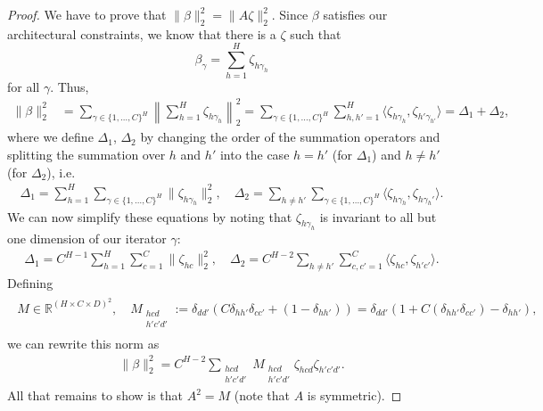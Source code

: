 \documentclass{article}
\theoremstyle{plain}
\theoremstyle{definition}
\theoremstyle{remark}
\begin{document}
\begin{proof}
We have to prove that $\|\beta\|_2^2=\|A\zeta\|_2^2$.
Since $\beta$ satisfies our architectural constraints, we know that there is a $\zeta$ such that
$$
\beta_{\gamma}=\sum_{h=1}^H\zeta_{h\gamma_h}
$$
for all $\gamma$.
Thus,
\begin{align*}
    \|\beta\|_2^2&=\sum_{\gamma\in\{1,\dotsc,C\}^H}\left\|\sum_{h=1}^H\zeta_{h\gamma_h}\right\|_2^2=\sum_{\gamma\in\{1,\dotsc,C\}^H}\sum_{h,h'=1}^H\langle\zeta_{h\gamma_h},\zeta_{h'\gamma_{h'}}\rangle=\Delta_1+\Delta_2,
\end{align*}
where we define $\Delta_1$, $\Delta_2$ by changing the order of the summation operators and splitting the summation over $h$ and $h'$ into the case $h=h'$ (for $\Delta_1$) and $h\neq h'$ (for $\Delta_2$), i.e.
\begin{align*}
    \Delta_1=\sum_{h=1}^H\sum_{\gamma\in\{1,\dotsc,C\}^H}\|\zeta_{h\gamma_h}\|_2^2,\quad\Delta_2=\sum_{h\neq h'}\sum_{\gamma\in\{1,\dotsc,C\}^H}\langle\zeta_{h\gamma_h},\zeta_{h\gamma_h'}\rangle.
\end{align*}
We can now simplify these equations by noting that $\zeta_{h\gamma_h}$ is invariant to all but one dimension of our iterator $\gamma$:
\begin{align*}
    \Delta_1=C^{H-1}\sum_{h=1}^H\sum_{c=1}^C\|\zeta_{hc}\|_2^2,\quad
    \Delta_2=C^{H-2}\sum_{h\neq h'}\sum_{c,c'=1}^C\langle\zeta_{hc},\zeta_{h'c'}\rangle.
\end{align*}
Defining
\begin{align}
\begin{split}
    M\in\mathbb{R}^{(H\times C\times D)^2},\quad
    M_{\substack{hcd\\h'c'd'}}:=\delta_{dd'}\left(C\delta_{hh'}\delta_{cc'}+(1-\delta_{hh'})\right)=\delta_{dd'}\left(1+C(\delta_{hh'}\delta_{cc'})-\delta_{hh'}\right),
\end{split}
\end{align}
we can rewrite this norm as
\begin{align*}
    \|\beta\|_2^2=C^{H-2}\sum_{\substack{hcd\\h'c'd'}}M_{\substack{hcd\\h'c'd'}}\zeta_{hcd}\zeta_{h'c'd'}.
\end{align*}
All that remains to show is that $A^2=M$ (note that $A$ is symmetric).


\end{proof}
\end{document}
